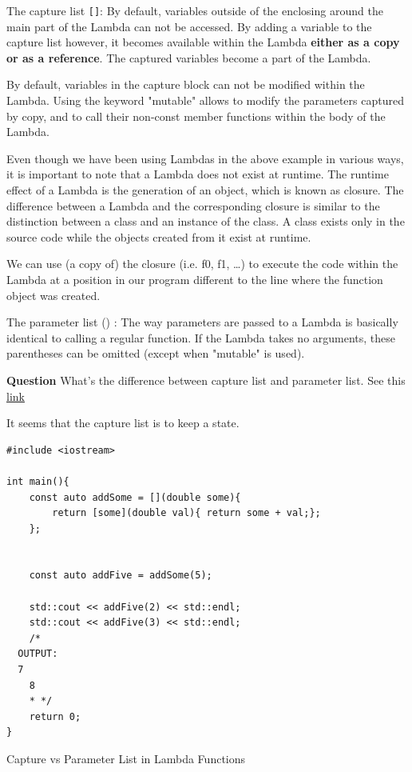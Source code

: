 \documentclass[11pt, a4paper]{article}
\begin{document}
The capture list \texttt{[]}: By default, variables outside of the enclosing {} around the main part of the Lambda can not be accessed. By adding a variable to the capture list however, it becomes available within the Lambda \textbf{either as a copy or as a reference}. The captured variables become a part of the Lambda.

By default, variables in the capture block can not be modified within the Lambda. Using the keyword "mutable" allows to modify the parameters captured by copy, and to call their non-const member functions within the body of the Lambda.


Even though we have been using Lambdas in the above example in various ways, it is important to note that a Lambda does not exist at runtime. The runtime effect of a Lambda is the generation of an object, which is known as closure. The difference between a Lambda and the corresponding closure is similar to the distinction between a class and an instance of the class. A class exists only in the source code while the objects created from it exist at runtime.

We can use (a copy of) the closure (i.e. f0, f1, …) to execute the code within the Lambda at a position in our program different to the line where the function object was created.

The parameter list () : The way parameters are passed to a Lambda is basically identical to calling a regular function. If the Lambda takes no arguments, these parentheses can be omitted (except when "mutable" is used).



\textbf{Question} What's the difference between capture list and parameter list. See this \href{https://stackoverflow.com/questions/28669941/c-lambdas-capture-list-vs-parameter-list}{link}

It seems that the capture list is to keep a state.


\begin{listing}
\begin{verbatim}
#include <iostream>

int main(){
	const auto addSome = [](double some){
		return [some](double val){ return some + val;};
	};


	const auto addFive = addSome(5);

	std::cout << addFive(2) << std::endl;
	std::cout << addFive(3) << std::endl;
	/*
  OUTPUT:
  7
	8
	* */
	return 0;
}
\end{verbatim}
\caption{Capture vs Parameter List in Lambda Functions}
\label{lst:capture_vs_parameter_list_in_lambda_functions}
\end{listing}
\end{document}
